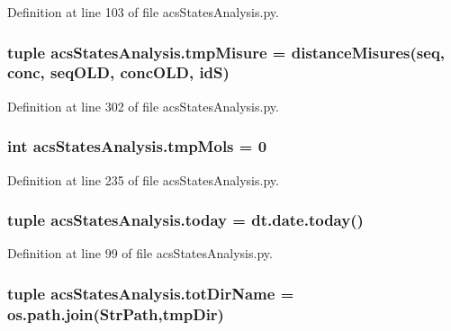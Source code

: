 Definition at line 103 of file acs\-States\-Analysis.\-py.

\hypertarget{a00098_a45529ce20ca353ca8ac251b4e88c91ff}{
\subsubsection[{tmp\-Misure}]{\setlength{\rightskip}{0pt plus 5cm}tuple acs\-States\-Analysis.\-tmp\-Misure = {\bf distance\-Misures}({\bf seq}, {\bf conc}, {\bf seq\-O\-L\-D}, {\bf conc\-O\-L\-D}, id\-S)}}\label{a00098_a45529ce20ca353ca8ac251b4e88c91ff}


Definition at line 302 of file acs\-States\-Analysis.\-py.

\hypertarget{a00098_aa24f8efad70335a8460f68902001ce64}{
\subsubsection[{tmp\-Mols}]{\setlength{\rightskip}{0pt plus 5cm}int acs\-States\-Analysis.\-tmp\-Mols = 0}}\label{a00098_aa24f8efad70335a8460f68902001ce64}


Definition at line 235 of file acs\-States\-Analysis.\-py.

\hypertarget{a00098_ac99ee9d8196d8a2305b9f4c795b23b97}{
\subsubsection[{today}]{\setlength{\rightskip}{0pt plus 5cm}tuple acs\-States\-Analysis.\-today = dt.\-date.\-today()}}\label{a00098_ac99ee9d8196d8a2305b9f4c795b23b97}


Definition at line 99 of file acs\-States\-Analysis.\-py.

\hypertarget{a00098_af4bd99f6cdaec32f48ed0074208b4f0c}{
\subsubsection[{tot\-Dir\-Name}]{\setlength{\rightskip}{0pt plus 5cm}tuple acs\-States\-Analysis.\-tot\-Dir\-Name = os.\-path.\-join({\bf Str\-Path},tmp\-Dir)}}\label{a00098_af4bd99f6cdaec32f48ed0074208b4f0c}


